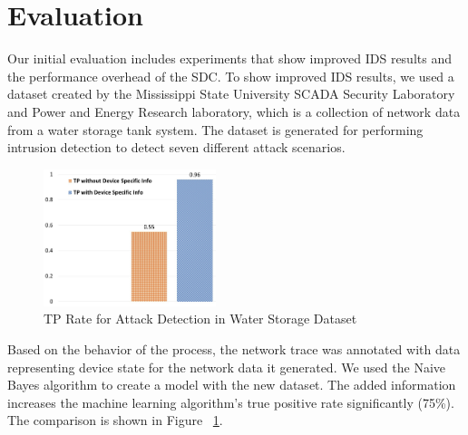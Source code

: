 \documentclass[conference]{IEEEtran}
\begin{document}
\section{Evaluation}
Our initial evaluation includes experiments that show improved IDS results and the performance overhead of the SDC. To show improved IDS results, we used a dataset \cite{c7} created by the Mississippi State University SCADA Security Laboratory and Power and Energy Research laboratory, which is a collection of network data from a water storage tank system. The dataset is generated for performing intrusion detection to detect seven different attack scenarios.
\begin{figure}[htbp]
\centering
\centerline{\includegraphics [width=.3\textwidth, height=4cm]{chart.jpg}}
\caption{TP Rate for Attack Detection in Water Storage Dataset}
\label{eval-anomaly}
\end{figure}
Based on the behavior of the process, the network trace was annotated with data representing device state for the network data it generated. We used the Naive Bayes algorithm to create a model with the new dataset. The added information increases the machine learning algorithm's true positive rate significantly (75\%). The comparison is shown in Figure ~\ref{eval-anomaly}.
\end{document}
